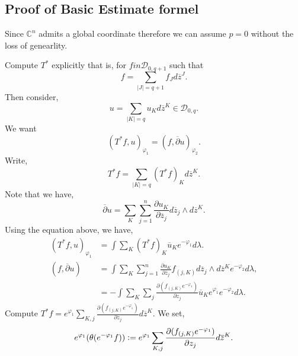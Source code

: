 \documentclass{article}
\newcommand{\defeq}{\vcentcolon=}
\newcommand{\C}[0]{\mathbb{C}}
\newcommand{\pd}[2]{{\frac {\partial#1} {\partial#2}}}
\begin{document}
\subsection{Proof of Basic Estimate formel}
Since $\C^n$ admits a global coordinate therefore we can assume $p=0$ without the loss of genearlity.
\begin{center}
\end{center}
Compute $T^*$ explicitly that is, for $fin\mathcal{D}_{0,q+1}$ such that 
\begin{equation*}
  f = \sum_{\vert J\vert = q+1}f_J d\overline{z}^J.
\end{equation*}
Then consider,
\begin{equation*}
  u = \sum_{\vert K\vert = q}u_Kd\overline{z}^K\in\mathcal{D}_{0,q}.
\end{equation*}
We want 
\begin{equation*}
  (T^*f,u)_{\varphi_1} = (f,\overline{\partial}u)_{\varphi_2}.
\end{equation*}
Write,
\begin{equation*}
  T^*f = \sum_{\vert K\vert = q}(T^*f)_Kd\overline{z}^K.
\end{equation*}
Note that we have,
\begin{equation*}
  \overline{\partial}u = \sum_K\sum_{j=1}^n \pd{u_K}{\overline{z}_j}d\overline{z}_j\wedge d\overline{z}^K.
\end{equation*}
Using the equation above, we have,
\begin{align*}
  (T^*f,u)_{\varphi_1} & =\int\sum_K (T^*f)_K\overline{u}_Ke^{-\varphi_1}d\lambda. \\
  (f,\overline{\partial}u) & = \int\sum_K\sum_{j=1}^n \pd{u_K}{\overline{z}_j}f_{(j,K)}d\overline{z}_j\wedge d\overline{z}^Ke^{-\varphi_2}d\lambda,\\
  & = -\int\sum_{K}\sum_j \pd{(f_{(j,K)}e^{-\varphi_1})}{z_j}\overline{u}_Ke^{\varphi_1}e^{-\varphi_2}d\lambda.
\end{align*}
Compute $T^*f = e^{\varphi_1}\sum_{K,j}\pd{(f_{(j,K)}e^{-\varphi_1})}{z_j}d\overline{z}^K$. 
We set,
\begin{equation*}
  e^{\varphi_1}(\theta(e^{-\varphi_1}f)) \defeq e^{\varphi_1}\sum_{K,j}\pd{(f_{(j,K)}e^{-\varphi_1})}{z_j}d\overline{z}^K.
\end{equation*}
\end{document}
